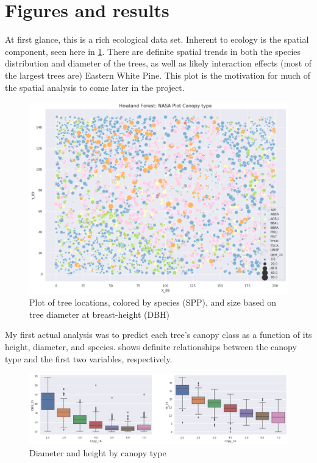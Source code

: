 \documentclass[11pt,a4paper]{article}
\begin{document}
\section{Figures and results}

At first glance, this is a rich ecological data set.  Inherent to ecology is the spatial component, seen here in \cref{CanopyDBH_PointPlot}.  There are definite spatial trends in both the species distribution and diameter of the trees, as well as likely interaction effects (most of the largest trees are) Eastern White Pine.  This plot is the motivation for much of the spatial analysis to come later in the project.

\begin{figure}[H]
\centering
\includegraphics[scale=.5]{../figures/update1/CanopyDBH_PointPlot.png}
\caption{Plot of tree locations, colored by species (SPP), and size based on tree diameter at breast-height (DBH)}
\label{CanopyDBH_PointPlot} 
\end{figure}


My first actual analysis was to predict each tree's canopy class as a function of its height, diameter, and species.   shows definite relationships between the canopy type and the first two variables, respectively.

\begin{figure}[H]
\centering
\includegraphics[scale=.4]{../figures/update1/Height_and_DBH_by_Canopy_BoxPlot.png}
\caption{Diameter and height by canopy type}
\label{Height_and_DBH_by_Canopy_BoxPlot} 
\end{figure}
\end{document}
